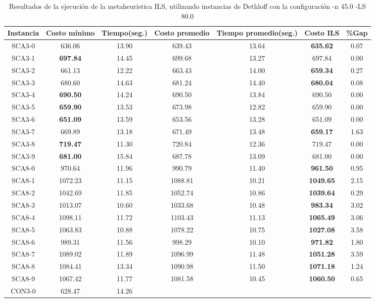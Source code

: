 \begin{table}[ht]
\caption{Resultados de la ejecución de la metaheurística ILS, utilizando instancias de Dethloff con la configuración -n 45.0 -LS 80.0}
\centering
\small
\begin{tabular}{c c c c c c c}
\hline\hline
Instancia & Costo mínimo & Tiempo(seg.) & Costo promedio & Tiempo promedio(seg.) & Costo ILS & \%Gap \\ [0.5ex]
\hline
SCA3-0 & 636.06 & 13.90 & 
639.43 & 13.64 & \bf{635.62} & 
0.07\\SCA3-1 & \bf{697.84} & 14.45 & 
699.68 & 13.27 & 697.84 & 0.00\\
SCA3-2 & 661.13 & 12.22 & 
663.43 & 14.00 & \bf{659.34} & 
0.27\\SCA3-3 & 680.60 & 14.63 & 
681.24 & 14.40 & \bf{680.04} & 
0.08\\SCA3-4 & \bf{690.50} & 14.24 & 
690.50 & 13.84 & 690.50 & 0.00\\
SCA3-5 & \bf{659.90} & 13.53 & 
673.98 & 12.82 & 659.90 & 0.00\\
SCA3-6 & \bf{651.09} & 13.59 & 
653.56 & 13.28 & 651.09 & 0.00\\
SCA3-7 & 669.89 & 13.18 & 
671.49 & 13.48 & \bf{659.17} & 
1.63\\SCA3-8 & \bf{719.47} & 11.30 & 
720.84 & 12.36 & 719.47 & 0.00\\
SCA3-9 & \bf{681.00} & 15.84 & 
687.78 & 13.09 & 681.00 & 0.00\\
SCA8-0 & 970.64 & 11.96 & 
990.79 & 11.40 & \bf{961.50} & 
0.95\\SCA8-1 & 1072.23 & 11.15 & 
1088.81 & 10.21 & \bf{1049.65} & 
2.15\\SCA8-2 & 1042.69 & 11.85 & 
1052.74 & 10.86 & \bf{1039.64} & 
0.29\\SCA8-3 & 1013.07 & 10.60 & 
1033.68 & 10.48 & \bf{983.34} & 
3.02\\SCA8-4 & 1098.11 & 11.72 & 
1103.43 & 11.13 & \bf{1065.49} & 
3.06\\SCA8-5 & 1063.83 & 10.88 & 
1078.22 & 10.75 & \bf{1027.08} & 
3.58\\SCA8-6 & 989.31 & 11.56 & 
998.29 & 10.10 & \bf{971.82} & 
1.80\\SCA8-7 & 1089.02 & 11.89 & 
1096.99 & 11.48 & \bf{1051.28} & 
3.59\\SCA8-8 & 1084.41 & 13.34 & 
1090.98 & 11.50 & \bf{1071.18} & 
1.24\\SCA8-9 & 1067.42 & 11.77 & 
1081.58 & 10.45 & \bf{1060.50} & 
0.65\\CON3-0 & 628.47 & 14.26 & 

\end{tabular}
\end{table}
